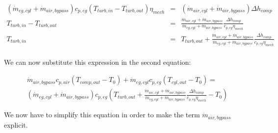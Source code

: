 \documentclass[]{article}
\begin{document}
\begin{eqnarray*}
(\dot{m}_{eg,cyl} + \dot{m}_{air,bypass}) c_{p,eg} (T_{turb,in} - T_{turb,out}) \eta_{mech}  & = & (\dot{m}_{air,cyl} + \dot{m}_{air,bypass}) \Delta h_{comp} \\
T_{turb,in} - T_{turb,out} & = & \frac{\dot{m}_{air,cyl} + \dot{m}_{air,bypass}}{\dot{m}_{eg,cyl} + \dot{m}_{air,bypass}} \frac{\Delta h_{comp}}{c_{p,eg} \eta_{mech}} \\
T_{turb,in} & = & T_{turb,out} + \frac{\dot{m}_{air,cyl} + \dot{m}_{air,bypass}}{\dot{m}_{eg,cyl} + \dot{m}_{air,bypass}} \frac{\Delta h_{comp}}{c_{p,eg} \eta_{mech}}  \\
\end{eqnarray*}

We can now substitute this expression in the second equation:

\begin{multline}
	\dot{m}_{air,bypass} c_{p,air} (T_{comp,out} - T_0) + \dot{m}_{eg,cyl} c_{p,eg}  (T_{cyl,out} - T_0)  =  \\ 
	(\dot{m}_{eg,cyl} + \dot{m}_{air,bypass}) c_{p,eg} (T_{turb,out} + \frac{\dot{m}_{air,cyl} + \dot{m}_{air,bypass}}{\dot{m}_{eg,cyl} + \dot{m}_{air,bypass}} \frac{\Delta h_{comp}}{c_{p,eg} \eta_{mech}} - T_0)
\end{multline}

We now have to simplify this equation in order to make the term $ \dot{m}_{air,bypass} $ explicit. 
\begin{comment}
One first thing we can do is noticing that the fraction:
$$
\frac{\dot{m}_{air,cyl} + \dot{m}_{air,bypass}}{\dot{m}_{eg,cyl} + \dot{m}_{air,bypass}}
$$
Can be rewritten as:
$$
\frac{1}{1 + \frac{\dot{m}_{fuel,cyl}}{\dot{m}_{air,cyl} + \dot{m}_{air,bypass}}}
$$
Since the numerator of the "subfraction" is much smaller than the denominator, we can make the assumption that this fraction behaves as:
$$
\frac{1}{1 + \epsilon}
$$
For which we know that:
$$
\frac{1}{1 + \epsilon} \approx 1 - \epsilon 
$$
That corresponds to:
$$
1 - \frac{\dot{m}_{fuel,cyl}}{\dot{m}_{air,cyl} + \dot{m}_{air,bypass}}
$$
\begin{multline}
\dot{m}_{air,bypass} c_{p,air} (T_{comp,out} - T_0) + \dot{m}_{eg,cyl} c_{p,eg}  (T_{cyl,out} - T_0)  =  \\ 
(\dot{m}_{eg,cyl} + \dot{m}_{air,bypass}) c_{p,eg} \left[T_{turb,out} + \left( 1 - \frac{\dot{m}_{fuel,cyl}}{\dot{m}_{air,cyl} + \dot{m}_{air,bypass}} \right) \frac{\Delta h_{comp}}{c_{p,eg} \eta_{mech}} - T_0\right]
\end{multline}
\end{comment}
\end{document}
